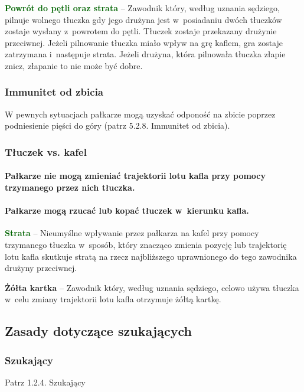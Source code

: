 \documentclass[12pt]{article}
\newcommand\yellowcard[1]{\bgroup\textcolor{darkyellow}{\textbf{#1}}}
\newcommand\other[1]{\bgroup\textcolor{darkgreen}{\textbf{#1}}}
\begin{document}
\other{Powrót do pętli oraz strata} -- Zawodnik który, według uznania
sędziego, pilnuje wolnego tłuczka gdy jego drużyna jest w~posiadaniu
dwóch tłuczków zostaje wysłany z~powrotem do pętli. Tłuczek zostaje
przekazany drużynie przeciwnej. Jeżeli pilnowanie tłuczka miało wpływ na
grę kaflem, gra zostaje zatrzymana i~następuje strata. Jeżeli drużyna,
która pilnowała tłuczka złapie znicz, złapanie to nie może być dobre.

\subsubsection{Immunitet od zbicia}

W pewnych sytuacjach pałkarze mogą uzyskać odponość na zbicie poprzez
podniesienie pięści do góry (patrz 5.2.8. Immunitet od zbicia).

\subsubsection{Tłuczek vs. kafel}

\paragraph{Pałkarze nie mogą zmieniać trajektorii lotu kafla przy
	pomocy trzymanego przez nich tłuczka.}

\paragraph{Pałkarze mogą rzucać lub kopać tłuczek w~kierunku
	kafla.}

\other{Strata} -- Nieumyślne wpływanie przez pałkarza na kafel przy pomocy
trzymanego tłuczka w~sposób, który znacząco zmienia pozycję lub
trajektorię lotu kafla skutkuje stratą na rzecz najbliższego
uprawnionego do tego zawodnika drużyny przeciwnej.

\yellowcard{Żółta kartka} -- Zawodnik który, według uznania sędziego, celowo
używa tłuczka w~celu zmiany trajektorii lotu kafla otrzymuje żółtą
kartkę.

\subsection{Zasady dotyczące szukających}

\subsubsection{Szukający}
Patrz 1.2.4. Szukający
\end{document}
